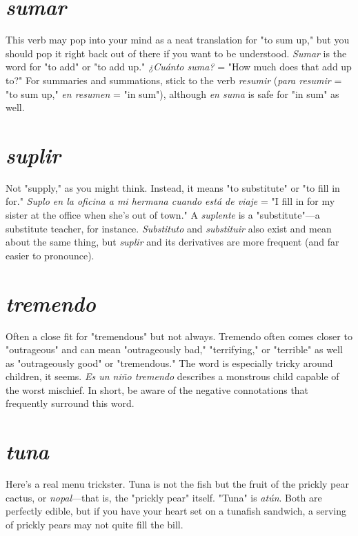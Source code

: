 \documentclass[14pt,a4paper,oneside]{memoir}
\begin{document}
\section{\emph{sumar}}

This verb may pop into your mind as a neat translation for "to sum up," but you should pop it right back out of there if
you want to be understood. \emph{Sumar} is the word for "to add" or "to add
up." \emph{¿Cuánto suma?} = "How much does that add up to?" For summaries and summations, stick to the verb \emph{resumir} (\emph{para resumir} = "to
sum up," \emph{en resumen} = "in sum"), although \emph{en suma} is safe for "in sum" as well.

\section{\emph{suplir}}

Not "supply," as you might think. Instead, it means
"to substitute" or "to fill in for." \emph{Suplo en la oficina a mi hermana
cuando está de viaje} = "I fill in for my sister at the office when she's
out of town." A \emph{suplente} is a "substitute"---a substitute teacher, for
instance. \emph{Substituto} and \emph{substituir} also exist and mean about the
same thing, but \emph{suplir} and its derivatives are more frequent (and far
easier to pronounce).

\section{\emph{tremendo}}

Often a close fit for "tremendous" but not always. Tremendo often comes closer to "outrageous" and can mean
"outrageously bad," "terrifying," or "terrible" as well as "outrageously
good" or "tremendous." The word is especially tricky around children,
it seems. \emph{Es un niño tremendo} describes a monstrous child capable of
the worst mischief. In short, be aware of the negative connotations
that frequently surround this word.

\section{\emph{tuna}}

Here's a real menu trickster. Tuna is not the fish but
the fruit of the prickly pear cactus, or \emph{nopal}---that is, the "prickly
pear" itself. "Tuna" is \emph{atún}. Both are perfectly edible, but if you have
your heart set on a tunafish sandwich, a serving of prickly pears may
not quite fill the bill.
\end{document}

